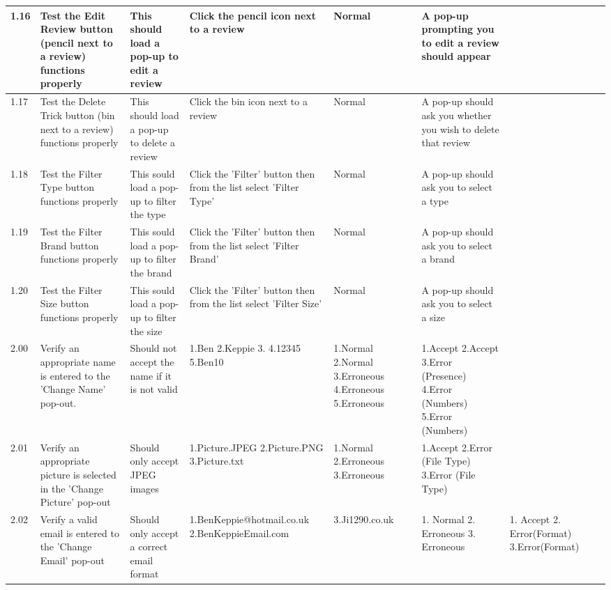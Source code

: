 \begin{landscape}
\begin{center}
\begin{longtable}{|p{1.5cm}|p{2.5cm}|p{2.5cm}|p{2cm}|p{2cm}|p{2cm}|p{2cm}|p{2cm}|}
1.16 & Test the Edit Review button (pencil next to a review) functions properly & This should load a pop-up to edit a review &  Click the pencil icon next to a review & Normal & A pop-up prompting you to edit a review should appear &  & \\ \hline

1.17  & Test the Delete Trick button (bin next to a review) functions properly & This should load a pop-up to delete a review &  Click the bin icon next to a review & Normal & A pop-up should ask you whether you wish to delete that review & &  \\ \hline

1.18 & Test the Filter Type button functions properly & This sould load a pop-up to filter the type & Click the 'Filter' button then from the list select 'Filter Type' & Normal &  A pop-up should ask you to select a type &  &\\ \hline

1.19 & Test the Filter Brand button functions properly & This sould load a pop-up to filter the brand & Click the 'Filter' button then from the list select 'Filter Brand' & Normal &  A pop-up should ask you to select a brand & & \\ \hline

1.20 & Test the Filter Size button functions properly & This sould load a pop-up to filter the size &  Click the 'Filter' button then from the list select 'Filter Size' & Normal &  A pop-up should ask you to select a size & & \\ \hline



2.00 & Verify an appropriate name is entered to the 'Change Name' pop-out. & Should not accept the name if it is not valid & 1.Ben 2.Keppie 3.   4.12345  5.Ben10 & 1.Normal 2.Normal 3.Erroneous 4.Erroneous 5.Erroneous & 1.Accept 2.Accept 3.Error (Presence) 4.Error (Numbers) 5.Error (Numbers) & & \\ \hline

2.01 & Verify an appropriate picture is selected in the 'Change Picture' pop-out & Should only accept JPEG images & 1.Picture.JPEG 2.Picture.PNG 3.Picture.txt & 1.Normal 2.Erroneous 3.Erroneous & 1.Accept 2.Error (File Type) 3.Error (File Type) & & \\ \hline

2.02 & Verify a valid email is entered to the 'Change Email' pop-out & Should only accept a correct email format & 1.BenKeppie@hotmail.co.uk 2.BenKeppieEmail.com & 3.Ji1290.co.uk & 1. Normal 2. Erroneous 3. Erroneous & 1. Accept 2. Error(Format) 3.Error(Format) \\ \hline


\end{longtable}
\end{center}
\end{landscape}
